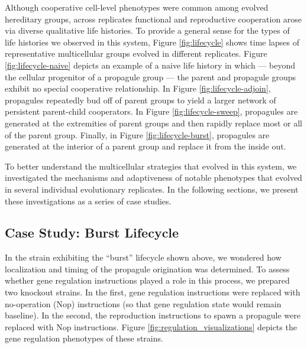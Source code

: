 Although cooperative cell-level phenotypes were common among evolved hereditary groups, across replicates functional and reproductive cooperation arose via diverse qualitative life histories.
To provide a general sense for the types of life histories we observed in this system, Figure \ref{fig:lifecycle} shows time lapses of representative multicellular groups evolved in different replicates.
Figure \ref{fig:lifecycle-naive} depicts an example of a naive life history in which --- beyond the cellular progenitor of a propagule group --- the parent and propagule groups exhibit no special cooperative relationship.
In Figure \ref{fig:lifecycle-adjoin}, propagules repeatedly bud off of parent groups to yield a larger network of persistent parent-child cooperators.
In Figure \ref{fig:lifecycle-sweep}, propagules are generated at the extremities of parent groups and then rapidly replace most or all of the parent group.
Finally, in Figure \ref{fig:lifecycle-burst}, propagules are generated at the interior of a parent group and replace it from the inside out.

To better understand the multicellular strategies that evolved in this system, we investigated the mechanisms and adaptiveness of notable phenotypes that evolved in several individual evolutionary replicates.
In the following sections, we present these investigations as a series of case studies.



\subsection{Case Study: Burst Lifecycle} \label{sec:gene-regulation}




In the strain exhibiting the ``burst'' lifecycle shown above, we wondered how localization and timing of the propagule origination was determined.
To assess whether gene regulation instructions played a role in this process, we prepared two knockout strains.
In the first, gene regulation instructions were replaced with no-operation (Nop) instructions (so that gene regulation state would remain baseline).
In the second, the reproduction instructions to spawn a propagule were replaced with Nop instructions.
Figure \ref{fig:regulation_visualizations} depicts the gene regulation phenotypes of these strains.

